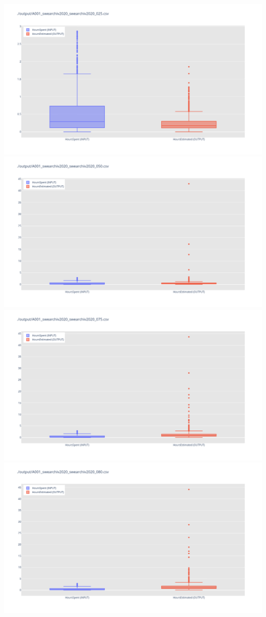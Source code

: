 \includegraphics[width=\textwidth]{Scripts/output/A001_swearchiv2020_swearchiv2020_025.csv.png}
\includegraphics[width=\textwidth]{Scripts/output/A001_swearchiv2020_swearchiv2020_050.csv.png}
\includegraphics[width=\textwidth]{Scripts/output/A001_swearchiv2020_swearchiv2020_075.csv.png}
\includegraphics[width=\textwidth]{Scripts/output/A001_swearchiv2020_swearchiv2020_080.csv.png}
